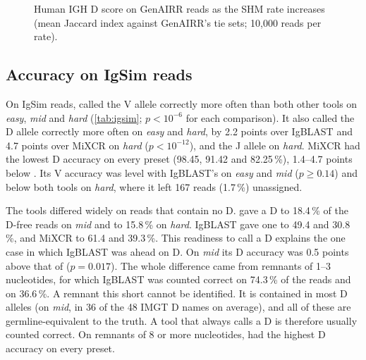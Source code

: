 \documentclass[11pt,a4paper]{article}
\begin{document}
\begin{figure}[t]
\centering
{}
\caption{Human IGH D score on GenAIRR reads as the SHM rate increases (mean
Jaccard index against GenAIRR's tie sets; 10,000 reads per rate).}
\label{fig:genairr-human}
\end{figure}

\subsection{Accuracy on IgSim reads}
\label{sec:igsim}

On IgSim reads, \swig{} called the V allele correctly more often than both
other tools on \emph{easy}, \emph{mid} and \emph{hard} (\cref{tab:igsim};
$p<10^{-6}$ for each comparison). It also called the D allele correctly more
often on \emph{easy} and \emph{hard}, by 2.2 points over IgBLAST and 4.7
points over MiXCR on \emph{hard} ($p<10^{-12}$), and the J allele on
\emph{hard}. MiXCR had the lowest D accuracy on every preset (98.45, 91.42
and 82.25\,\%), 1.4--4.7 points below \swig. Its V accuracy was level with
IgBLAST's on \emph{easy} and \emph{mid} ($p\ge0.14$) and below both tools on
\emph{hard}, where it left 167 reads (1.7\,\%) unassigned.

The tools differed widely on reads that contain no D. \swig{} gave a D to
18.4\,\% of the D-free reads on \emph{mid} and to 15.8\,\% on \emph{hard}.
IgBLAST gave one to 49.4 and 30.8\,\%, and MiXCR to 61.4 and 39.3\,\%. This
readiness to call a D explains the one case in which IgBLAST was ahead on D.
On \emph{mid} its D accuracy was 0.5 points above that of \swig{}
($p=0.017$). The whole difference came from remnants of 1--3 nucleotides,
for which IgBLAST was counted correct on 74.3\,\% of the reads and \swig{}
on 36.6\,\%. A remnant this short cannot be identified. It is contained in
most D alleles (on \emph{mid}, in 36 of the 48 IMGT D names on average), and
all of these are germline-equivalent to the truth. A tool that always calls
a D is therefore usually counted correct. On remnants of 8 or
more nucleotides, \swig{} had the highest D accuracy on every preset.
\end{document}

